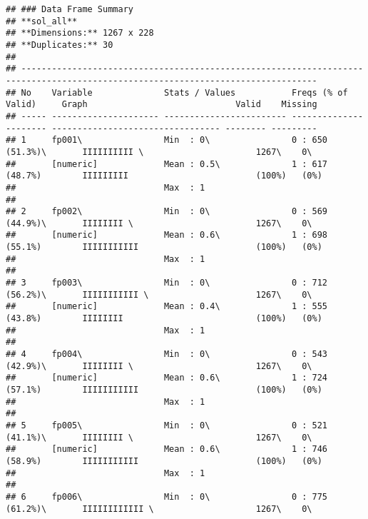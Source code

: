\documentclass[]{article}
\begin{document}
\begin{verbatim}
## ### Data Frame Summary  
## **sol_all**   
## **Dimensions:** 1267 x 228  
## **Duplicates:** 30  
## 
## --------------------------------------------------------------------------------------------------------------------------------
## No    Variable              Stats / Values           Freqs (% of Valid)     Graph                             Valid    Missing  
## ----- --------------------- ------------------------ ---------------------- --------------------------------- -------- ---------
## 1     fp001\                Min  : 0\                0 : 650 (51.3%)\       IIIIIIIIII \                      1267\    0\       
##       [numeric]             Mean : 0.5\              1 : 617 (48.7%)        IIIIIIIII                         (100%)   (0%)     
##                             Max  : 1                                                                                            
## 
## 2     fp002\                Min  : 0\                0 : 569 (44.9%)\       IIIIIIII \                        1267\    0\       
##       [numeric]             Mean : 0.6\              1 : 698 (55.1%)        IIIIIIIIIII                       (100%)   (0%)     
##                             Max  : 1                                                                                            
## 
## 3     fp003\                Min  : 0\                0 : 712 (56.2%)\       IIIIIIIIIII \                     1267\    0\       
##       [numeric]             Mean : 0.4\              1 : 555 (43.8%)        IIIIIIII                          (100%)   (0%)     
##                             Max  : 1                                                                                            
## 
## 4     fp004\                Min  : 0\                0 : 543 (42.9%)\       IIIIIIII \                        1267\    0\       
##       [numeric]             Mean : 0.6\              1 : 724 (57.1%)        IIIIIIIIIII                       (100%)   (0%)     
##                             Max  : 1                                                                                            
## 
## 5     fp005\                Min  : 0\                0 : 521 (41.1%)\       IIIIIIII \                        1267\    0\       
##       [numeric]             Mean : 0.6\              1 : 746 (58.9%)        IIIIIIIIIII                       (100%)   (0%)     
##                             Max  : 1                                                                                            
## 
## 6     fp006\                Min  : 0\                0 : 775 (61.2%)\       IIIIIIIIIIII \                    1267\    0\       

\end{verbatim}
\end{document}
